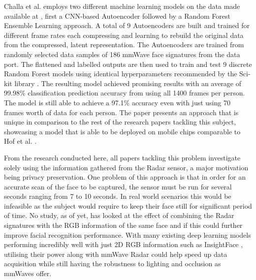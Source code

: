 \documentclass{interim}
\begin{document}
Challa et al. \cite{challa2021face} employs two different machine learning models on the data made available at \cite{mmwavefacedata}, first a CNN-based Autoencoder followed by a Random Forest Ensemble Learning approach. A total of 9 Autoencoders are built and trained for different frame rates each compressing and learning to rebuild the original data from the compressed, latent representation. The Autoencoders are trained from randomly selected data samples of 186 mmWave face signatures from the data port. The flattened and labelled outputs are then used to train and test 9 discrete Random Forest models using identical hyperparameters recommended by the Sci-kit library \cite{}. The resulting model achieved promising results with an average of 99.98\% classification prediction accuracy from using all 1400 frames per person. The model is still able to achieve a 97.1\% accuracy even with just using 70 frames worth of data for each person. The paper presents an approach that is unique in comparison to the rest of the research papers tackling this subject, showcasing a model that is able to be deployed on mobile chips comparable to Hof et al. \cite{hof2020face}.

From the research conducted here, all papers tackling this problem investigate solely using the information gathered from the Radar sensor, a major motivation being privacy preservation. One problem of this approach is that in order for an accurate scan of the face to be captured, the sensor must be run for several seconds ranging from 7 to 10 seconds. In real world scenarios this would be infeasible as the subject would require to keep their face still for significant period of time. No study, as of yet, has looked at the effect of combining the Radar signatures with the RGB information of the same face and if this could further improve facial recognition performance. With many existing deep learning models performing incredibly well with just 2D RGB information such as InsightFace \cite{deng2018arcface}, utilising their power along with mmWave Radar could help speed up data acquisition while still having the robustness to lighting and occlusion as mmWaves offer. 
\end{document}
